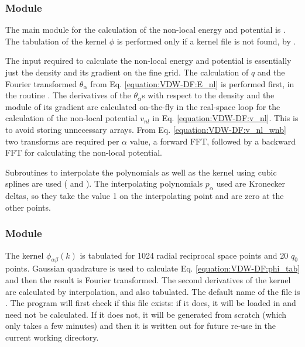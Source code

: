 \documentclass[letterpaper,10pt,english]{sphinxmanual}
\begin{document}
\subsubsection{Module }
\label{\detokenize{VDW-DF:module-nlxc-mod}}
The main module for the calculation of the non-local energy and
potential is . The tabulation of the kernel \(\phi\) is
performed only if a kernel file is not found, by .

The input required to calculate the non-local energy and potential is
essentially just the density and its gradient on the fine grid. The
calculation of \(q\) and the Fourier transformed
\(\theta_\alpha\) from Eq. \eqref{equation:VDW-DF:E_nl} is performed first, in the
routine . The derivatives of the
\(\theta_\alpha\)s with respect to the density and the module of
its gradient are calculated on-the-fly in the real-space loop for the
calculation of the non-local potential \(v_{nl}\) in Eq. \eqref{equation:VDW-DF:v_nl}. This
is to avoid storing unnecessary arrays. From Eq. \eqref{equation:VDW-DF:v_nl_wnb} two
transforms are required per \(\alpha\) value, a forward FFT,
followed by a backward FFT for calculating the non-local potential.

Subroutines to interpolate the polynomials as well as the kernel using
cubic splines are used ( and ). The
interpolating polynomials \(p_\alpha\) used are Kronecker deltas, so
they take the value 1 on the interpolating point and are zero at the
other points.


\subsubsection{Module }
\label{\detokenize{VDW-DF:module-vdwdf-kernel}}
The kernel \(\phi_{\alpha\beta}(k)\) is tabulated for 1024 radial
reciprocal space points and 20 \(q_0\) points. Gaussian quadrature
is used to calculate Eq. \eqref{equation:VDW-DF:phi_tab} and then the result is Fourier
transformed. The second derivatives of the kernel are calculated by
interpolation, and also tabulated. The default name of the file is
. The program will first check if this file exists: if
it does, it will be loaded in and need not be calculated. If it does
not, it will be generated from scratch (which only takes a few minutes)
and then it is written out for future re-use in the current working
directory.
\end{document}
